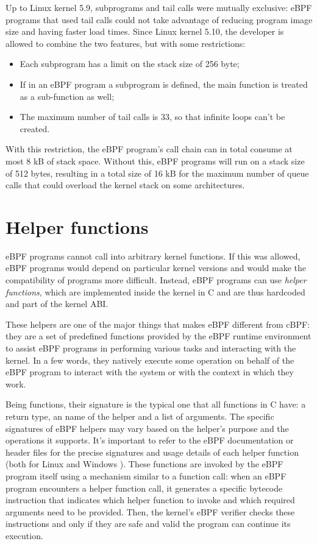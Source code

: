 Up to Linux kernel 5.9, subprograms and tail calls were mutually exclusive: eBPF programs that used tail calls could not take advantage of reducing program image size and having faster load times.
Since Linux kernel 5.10, the developer is allowed to combine the two features, but with some restrictions:

\begin{itemize}
	\item 
		Each subprogram has a limit on the stack size of 256 byte;
	\item 
		If in an eBPF program a subprogram is defined, the main function is treated as a sub-function as well;
	\item 
		The maximum number of tail calls is 33, so that infinite loops can't be created.
\end{itemize}

With this restriction, the eBPF program’s call chain can in total consume at most 8 kB of stack space. 
Without this, eBPF programs will run on a stack size of 512 bytes, resulting in a total size of 16 kB for the maximum number of queue calls that could overload the kernel stack on some architectures.

\section{Helper functions}

eBPF programs cannot call into arbitrary kernel functions. 
If this was allowed, eBPF programs would depend on particular kernel versions and would make the compatibility of programs more difficult. 
Instead, eBPF programs can use \textit{helper functions}, which are implemented inside the kernel in C and are thus hardcoded and part of the kernel ABI. 

These helpers are one of the major things that makes eBPF different from cBPF: they are a set of predefined functions provided by the eBPF runtime environment to assist eBPF programs in performing various tasks and interacting with the kernel.
In a few words, they natively execute some operation on behalf of the eBPF program to interact with the system or with the context in which they work. 

Being functions, their signature is the typical one that all functions in C have: a return type, an name of the helper and a list of arguments.
The specific signatures of eBPF helpers may vary based on the helper's purpose and the operations it supports. 
It's important to refer to the eBPF documentation or header files for the precise signatures and usage details of each helper function (both for Linux \cite{LinuxHelpers} and Windows \cite{WindowsHelpers}).
These functions are invoked by the eBPF program itself using a mechanism similar to a function call: when an eBPF program encounters a helper function call, it generates a specific bytecode instruction that indicates which helper function to invoke and which required arguments need to be provided.
Then, the kernel's eBPF verifier checks these instructions and only if they are safe and valid the program can continue its execution.

